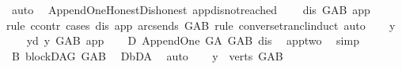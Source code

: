 \begin{isabellebody}
\ auto\isanewline
{}\isamarkupfalse%
%
\endisatagproof
{\isafoldproof}%
%
\isadelimproof
\isanewline
%
\endisadelimproof
{}\isamarkupfalse%
%
\isadelimdocument
%
\endisadelimdocument
%
\isatagdocument
%
\isamarkuptrue%
%
\endisatagdocument
{\isafolddocument}%
%
\isadelimdocument
%
\endisadelimdocument
{}\isamarkupfalse%
\ {\isacharparenleft}{\kern0pt}\ Append{\isacharunderscore}{\kern0pt}One{\isacharunderscore}{\kern0pt}Honest{\isacharunderscore}{\kern0pt}Dishonest{\isacharparenright}{\kern0pt}\ app{\isacharunderscore}{\kern0pt}dis{\isacharunderscore}{\kern0pt}not{\isacharunderscore}{\kern0pt}reached{\isacharcolon}{\kern0pt}\isanewline
\ \ \ {\isachardoublequoteopen}{\isasymnot}\ dis\ {\isasymrightarrow}\isactrlsup {\isacharplus}{\kern0pt}\isactrlbsub G{\isacharunderscore}{\kern0pt}AB\isactrlesub \ app{\isachardoublequoteclose}\ \isanewline
%
\isadelimproof
%
\endisadelimproof
%
\isatagproof
{}\isamarkupfalse%
{\isacharparenleft}{\kern0pt}rule\ ccontr{\isacharcomma}{\kern0pt}\ cases\ dis\ app\ {\isachardoublequoteopen}{\isacharparenleft}{\kern0pt}arcs{\isacharunderscore}{\kern0pt}ends\ G{\isacharunderscore}{\kern0pt}AB{\isacharparenright}{\kern0pt}{\isachardoublequoteclose}\ rule{\isacharcolon}{\kern0pt}\ converse{\isacharunderscore}{\kern0pt}trancl{\isacharunderscore}{\kern0pt}induct{\isacharcomma}{\kern0pt}\ auto{\isacharparenright}{\kern0pt}\isanewline
\ \ \isamarkupfalse%
\ y\isanewline
\ \ \isamarkupfalse%
\ y{\isacharunderscore}{\kern0pt}d{\isacharcolon}{\kern0pt}\ {\isachardoublequoteopen}y\ {\isasymrightarrow}\isactrlbsub G{\isacharunderscore}{\kern0pt}AB\isactrlesub \ app{\isachardoublequoteclose}\isanewline
\ \ \isamarkupfalse%
\ D{}{\isacharcolon}{\kern0pt}\ Append{\isacharunderscore}{\kern0pt}One\ G{\isacharunderscore}{\kern0pt}A\ G{\isacharunderscore}{\kern0pt}AB\ dis\ \isamarkupfalse%
\ app{\isacharunderscore}{\kern0pt}two\ \isamarkupfalse%
\ simp\isanewline
\ \ \isamarkupfalse%
\ B{}{\isacharcolon}{\kern0pt}\ blockDAG\ G{\isacharunderscore}{\kern0pt}AB\ \isamarkupfalse%
\ D{}{\isachardot}{\kern0pt}bD{\isacharunderscore}{\kern0pt}A\ \isamarkupfalse%
\ auto\isanewline
\ \ \isamarkupfalse%
\ {\isachardoublequoteopen}y\ {\isasymin}\ verts\ G{\isacharunderscore}{\kern0pt}AB{\isachardoublequoteclose}\ \isamarkupfalse%

\end{isabellebody}
